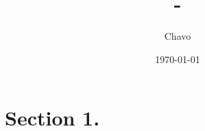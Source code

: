 \documentclass[12pt,twoside]{article}
\title{\course-\assignment}
\author{Chavo}
\date{\today}
\begin{document}
\nocite{*}
\maketitle

\section{Section 1.}
\lipsum[5]

\newpage
$ $\clearpage %


\end{document}

